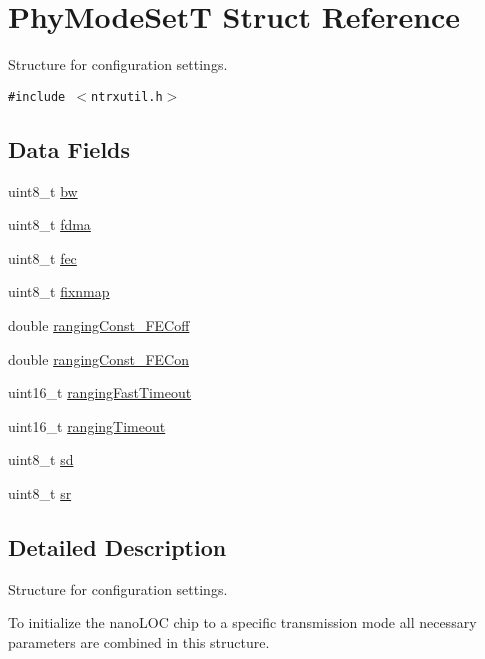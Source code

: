 \hypertarget{structPhyModeSetT}{
\section{Phy\-Mode\-Set\-T Struct Reference}
\label{structPhyModeSetT}
}
Structure for configuration settings.  


{\tt \#include $<$ntrxutil.h$>$}

\subsection*{Data Fields}
\begin{CompactItemize}
\item 
uint8\_\-t \hyperlink{structPhyModeSetT_1041f65c103b9effe4227d2875e32707}{bw}
\item 
uint8\_\-t \hyperlink{structPhyModeSetT_3168873bb8162b95d357e01e2a8886d0}{fdma}
\item 
uint8\_\-t \hyperlink{structPhyModeSetT_53d8f7593c8853dac46867b9ec0c034c}{fec}
\item 
uint8\_\-t \hyperlink{structPhyModeSetT_a9fa873508ca6dadecca9e487f8c7dc0}{fixnmap}
\item 
double \hyperlink{structPhyModeSetT_ee565cfc56fe5487c8f29ec9c3312bfe}{ranging\-Const\_\-FECoff}
\item 
double \hyperlink{structPhyModeSetT_0cf73098ea3b84402bb7a04f4f86411d}{ranging\-Const\_\-FECon}
\item 
uint16\_\-t \hyperlink{structPhyModeSetT_73866d2c804bd7b5c89a4c750431e451}{ranging\-Fast\-Timeout}
\item 
uint16\_\-t \hyperlink{structPhyModeSetT_00eb02515b60998c69e02156319fccea}{ranging\-Timeout}
\item 
uint8\_\-t \hyperlink{structPhyModeSetT_f3034f48d48b2b3129886c1470e3733d}{sd}
\item 
uint8\_\-t \hyperlink{structPhyModeSetT_a46c7440a4b3c19cf82acec549428474}{sr}
\end{CompactItemize}


\subsection{Detailed Description}
Structure for configuration settings. 

To initialize the nano\-LOC chip to a specific transmission mode all necessary parameters are combined in this structure. 




